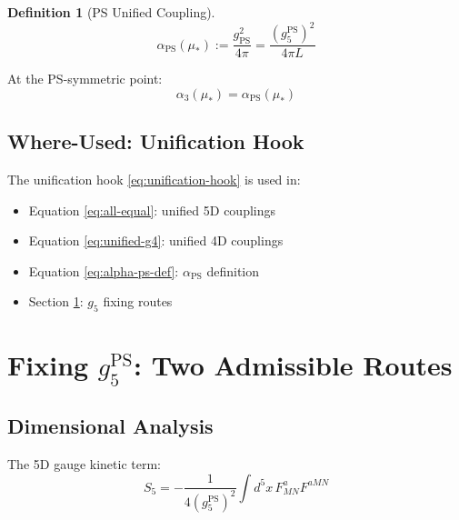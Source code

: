 \documentclass[11pt,a4paper]{article}
\theoremstyle{definition}
\newtheorem{definition}{Definition}[section]
\begin{document}
\begin{definition}[PS Unified Coupling]
\label{def:alpha-ps}
\begin{equation}
\label{eq:alpha-ps-def}
\boxed{\alpha_{\text{PS}}(\mu_*) := \frac{g_{\text{PS}}^2}{4\pi} = \frac{(g_5^{\text{PS}})^2}{4\pi L}}
\end{equation}
\end{definition}

At the PS-symmetric point:
\begin{equation}
\label{eq:alpha3-equals-alphaps}
\alpha_3(\mu_*) = \alpha_{\text{PS}}(\mu_*)
\end{equation}

\subsection{Where-Used: Unification Hook}
\label{subsec:where-used-hook}

The unification hook \eqref{eq:unification-hook} is used in:
\begin{itemize}
  \item Equation \eqref{eq:all-equal}: unified 5D couplings
  \item Equation \eqref{eq:unified-g4}: unified 4D couplings
  \item Equation \eqref{eq:alpha-ps-def}: $\alpha_{\text{PS}}$ definition
  \item Section \ref{sec:g5-fixing}: $g_5$ fixing routes
\end{itemize}

\section{Fixing $g_5^{\text{PS}}$: Two Admissible Routes}
\label{sec:g5-fixing}

\subsection{Dimensional Analysis}
\label{subsec:g5-dim}

The 5D gauge kinetic term:
\begin{equation}
\label{eq:5d-kinetic}
S_5 = -\frac{1}{4(g_5^{\text{PS}})^2} \int d^5x \, F_{MN}^a F^{aMN}
\end{equation}
\end{document}
